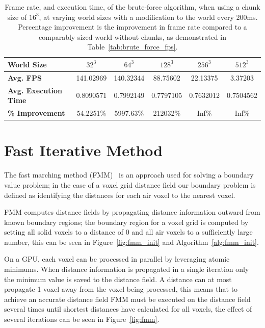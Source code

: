 \begin{table}[h!]
    \centering
    \vspace{0.5em}
    \begin{tabular}{l|*{5}{c}}
        \toprule
        \textbf{World Size}          & \textbf{\(32^3\)} & \textbf{\(64^3\)} & \textbf{\(128^3\)} & \textbf{\(256^3\)} & \textbf{\(512^3\)} \\
        \midrule
        \textbf{Avg. FPS}            & 141.02969         & 140.32344         & 88.75602           & 22.13375           & 3.37203            \\
        \textbf{Avg. Execution Time} & 0.8090571         & 0.7992149         & 0.7797105          & 0.7632012          & 0.7504562          \\
        \textbf{\% Improvement}      & 54.2251\%         & 5997.63\%         & 212032\%           & Inf\%              & Inf\%              \\
        \bottomrule
    \end{tabular}
    \caption{Frame rate, and execution time, of the brute-force algorithm, when using a chunk size of \(16^3\), at
        varying world sizes with a modification to the world every 200ms. Percentage improvement is the improvement in
        frame rate compared to a comparably sized world without chunks, as demonstrated in Table~\ref{tab:brute_force_fps}.}
\end{table}

\FloatBarrier

\section{Fast Iterative Method}
The fast marching method (FMM)~\cite{sethian1999fast} is an approach used for solving a boundary value problem; in the
case of a voxel grid distance field our boundary problem is defined as identifying the distances for each air voxel to
the nearest voxel.

FMM computes distance fields by propagating distance information outward from known boundary regions; the boundary
region for a voxel grid is computed by setting all solid voxels to a distance of 0 and all air voxels to a sufficiently
large number, this can be seen in Figure~\ref{fig:fmm_init} and Algorithm~\ref{alg:fmm_init}.

On a GPU, each voxel can be processed in parallel by leveraging atomic minimums. When distance information is propagated
in a single iteration only the minimum value is saved to the distance field. A distance can at most propagate 1 voxel
away from the voxel being processed, this means that to achieve an accurate distance field FMM must be executed on the
distance field several times until shortest distances have calculated for all voxels, the effect of several iterations
can be seen in Figure~\ref{fig:fmm}.

